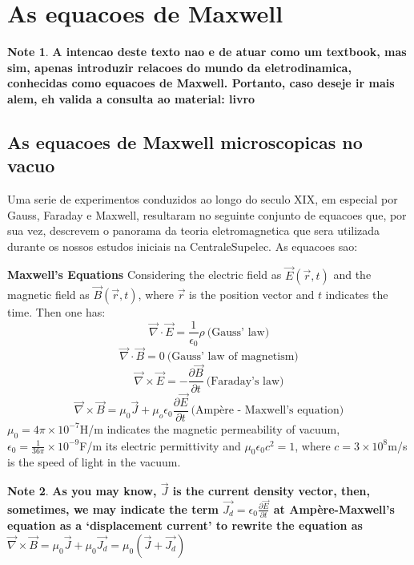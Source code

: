 \documentclass[11pt]{article}
\theoremstyle{definition}
\newtheorem{note}{Note}
\begin{document}
\section{As equacoes de Maxwell}
\begin{note}
    \textbf{A intencao deste texto nao e de atuar como um textbook, mas sim, apenas introduzir relacoes do mundo da eletrodinamica,
    conhecidas como equacoes de Maxwell. Portanto, caso deseje ir mais alem, eh valida a consulta ao material: livro}
\end{note}
\subsection{As equacoes de Maxwell microscopicas no vacuo}
Uma serie de experimentos conduzidos ao longo do seculo XIX, em especial por Gauss, Faraday e Maxwell, resultaram no seguinte conjunto de equacoes que,
por sua vez, descrevem o panorama da teoria eletromagnetica que sera utilizada durante os nossos estudos iniciais na CentraleSupelec. As equacoes sao:
\begin{shaded}
    \textbf{Maxwell's Equations}\newline
    Considering the electric field as $\vec{E}\left(\vec{r},t\right)$ and the magnetic field as $\vec{B}\left(\vec{r},t\right)$, where $\vec{r}$ is the position vector and $t$ indicates the time. Then one has:
    \begin{equation}
    \vec{\nabla} \cdot \vec{E} = \frac{1}{\epsilon_0}\rho \ \text{(Gauss' law)}
    \end{equation}
    \begin{equation}
        \vec{\nabla} \cdot \vec{B} = 0 \ \text{(Gauss' law of magnetism)}
    \end{equation}
    \begin{equation}
        \vec{\nabla} \times \vec{E} = -\frac{\partial \vec{B}}{\partial t} \ \text{(Faraday's law)}
    \end{equation}
    \begin{equation}
        \vec{\nabla} \times \vec{B} = \mu_0 \vec{J} + \mu_o \epsilon_0 \frac{\partial \vec{E}}{\partial t} \ \text{(Ampère - Maxwell's equation)}
    \end{equation}
$\mu_0 = 4\pi \times 10^{-7}$H/m indicates the magnetic permeability of vacuum, $\epsilon_0 = \frac{1}{36\pi}\times 10^{-9}$F/m its electric permittivity and $\mu_0 \epsilon_0 c^2 = 1$, where $c = 3 \times 10^{8}$m/s is the speed of light in the vacuum.
\begin{note}
    \textbf{As you may know, $\vec{J}$ is the current density vector, then, sometimes, we may indicate the term $\vec{J_{d}} = \epsilon_0 \frac{\partial \vec{E}}{\partial t}$ at Ampère-Maxwell's equation as a `displacement current' to rewrite the equation as
    $\vec{\nabla} \times \vec{B} = \mu_0 \vec{J} + \mu_0 \vec{J_{d}} = \mu_0 \left(\vec{J} + \vec{J_{d}}\right)$}
\end{note}
\end{shaded}
\end{document}
